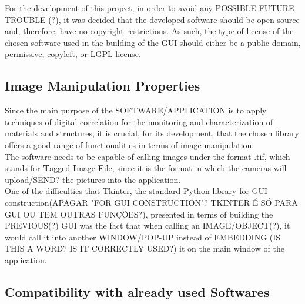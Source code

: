 For the development of this project, in order to avoid any POSSIBLE FUTURE TROUBLE (?), it was decided that the developed software should be open-source and, therefore, have no  copyright restrictions. As such, the type of license of the chosen software used in the building of the GUI should either be a public domain, permissive, copyleft, or LGPL license.


\subsection{Image Manipulation Properties}
\label{sub:image_manipulation_properties}

Since the main purpose of the SOFTWARE/APPLICATION is to apply techniques of digital correlation for the monitoring and characterization of materials and structures, it is crucial, for its development, that the chosen library offers a good range of functionalities in terms of image manipulation.\\

The software needs to be capable of calling images under the format .tif, which stands for \textbf{T}agged \textbf{I}mage \textbf{F}ile, since it is the format in which the cameras will upload/SEND? the pictures into the application. \\


One of the difficulties that Tkinter, the standard Python library for GUI construction(APAGAR "FOR GUI CONSTRUCTION"? TKINTER É SÓ PARA GUI OU TEM OUTRAS FUNÇÕES?), presented in terms of building the PREVIOUS(?) GUI was the fact that when calling an IMAGE/OBJECT(?), it would call it into another WINDOW/POP-UP instead of EMBEDDING (IS THIS A WORD? IS IT CORRECTLY USED?) it on the main window of the application. \\

\subsection{Compatibility with already used Softwares}
\label{sub:compatibility_with_already_used_softwares}

